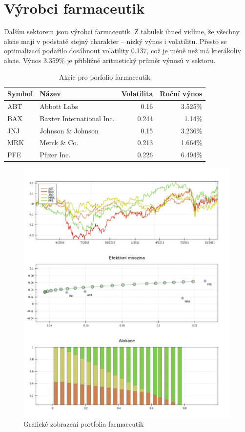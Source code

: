 \documentclass[12pt,a4paper]{report}
\begin{document}
  \section{Výrobci farmaceutik}
    Dalším sektorem jsou výrobci farmaceutik. Z tabulek ihned vidíme, že všechny akcie mají v podstatě stejný charakter -- nízký výnos i volatilitu. Přesto se optimalizací podařilo dosáhnout volatility 0.137, což je méně než má kterákoliv akcie. Výnos 3.359\% je přibližně aritmetický průměr výnosů v sektoru.
    
    \begin{table}[htb]
      \centering
      \begin{tabular}{|l|l|r|r|}
        \hline
        Symbol&Název&Volatilita&Roční výnos\\\hline\hline
        ABT&Abbott Labs &0.16&3.525\%\\\hline
        BAX&Baxter International Inc. &0.244&1.14\%\\\hline
        JNJ&Johnson \& Johnson &0.15&3.236\%\\\hline
        MRK&Merck \& Co. &0.213&1.664\%\\\hline
        PFE&Pfizer Inc. &0.226&6.494\%\\\hline
      \end{tabular}
      \caption{Akcie pro porfolio farmaceutik}
    \end{table}

    \begin{figure}[htb]
      \centering
        \includegraphics[height=0.90\textheight]{drugs1.png}
       \caption{Grafické zobrazení portfolia farmaceutik}
    \end{figure}
\end{document}
